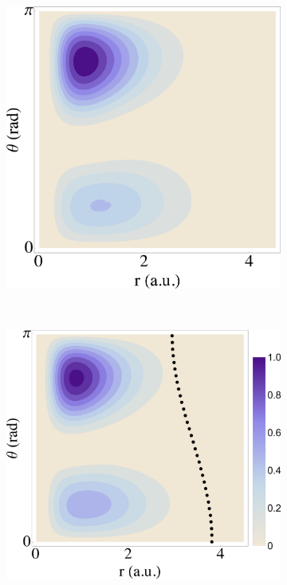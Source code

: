 \begin{figure}
  \centering
  \begin{subfigure}[b]{0.245\linewidth}
    \centering
    \includegraphics[width=\textwidth]{figures/ch_H2O/3a1/contour3a132s.eps}
    \caption{}\label{fig:Moccia32s}
  \end{subfigure}
  \,
  \begin{subfigure}[b]{0.275\linewidth}
    \centering
    \includegraphics[width=\textwidth]{figures/ch_H2O/3a1/contour3a1intpl.eps}

\end{subfigure}
\end{figure}
